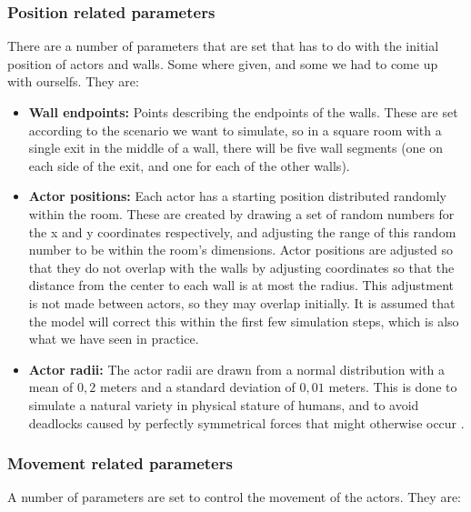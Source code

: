 \subsubsection{Position related parameters}
There are a number of parameters that are set that has to do with the initial 
position of actors and walls. Some where given, and some we had to come up
with ourselfs. They are:

\begin{itemize}
    \item \textbf{Wall endpoints:} Points describing the endpoints of the 
        walls. These are set according to the scenario we want to simulate, so 
        in a square room with a single exit in the middle of a wall, there 
        will be five wall segments (one on each side of the exit, and one for 
        each of the other walls).

    \item \textbf{Actor positions:} Each actor has a starting position 
        distributed randomly within the room. These are created by drawing a 
        set of random numbers for the x and y coordinates respectively, and 
        adjusting the range of this random number to be within the room's 
        dimensions. Actor positions are adjusted so that they do not overlap 
        with the walls by adjusting coordinates so that the distance from the 
        center to each wall is at most the radius. This adjustment is not made 
        between actors, so they may overlap initially. It is assumed that the 
        model will correct this within the first few simulation steps, which 
        is also what we have seen in practice.

    \item \textbf{Actor radii:} The actor radii are drawn from a normal 
        distribution with a mean of $0,2$ meters and a standard deviation of 
        $0,01$ meters. This is done to simulate a natural variety in physical 
        stature of humans, and to avoid deadlocks caused by perfectly 
        symmetrical forces that might otherwise occur \cite{helbing00}.
\end{itemize}

\subsubsection{Movement related parameters}
A number of parameters are set to control the movement of the actors. They 
are:

